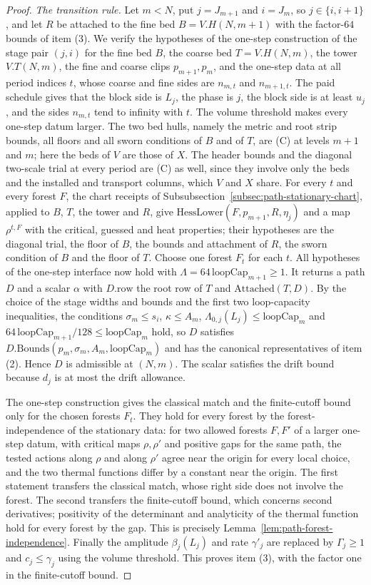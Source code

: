 \begin{proof}
\emph{The transition rule.} Let $m<N$, put $j=J_{m+1}$ and $i=J_m$, so
$j\in\{i,i+1\}$, and let $R$ be attached to the fine bed
$B=V.H(N,m+1)$ with the factor-$64$ bounds of item (3). We verify the
hypotheses of the one-step construction of the stage pair $(j,i)$ for
the fine bed $B$, the coarse bed $T=V.H(N,m)$, the tower $V.T(N,m)$,
the fine and coarse clips $p_{m+1},p_m$, and the one-step data at all
period indices $t$, whose coarse and fine sides are $n_{m,t}$ and
$n_{m+1,t}$. The paid schedule gives that the block side is $L_j$, the
phase is $j$, the block side is at least $u_j$, and the sides
$n_{m,t}$ tend to infinity with $t$. The volume threshold makes every
one-step datum larger. The two bed hulls, namely the metric and root
strip bounds, all floors and all sworn conditions of $B$ and of $T$,
are \textup{(C)} at levels $m+1$ and $m$; here the beds of $V$ are
those of $X$. The header bounds and the diagonal two-scale trial at
every period are \textup{(C)} as well, since they involve only the
beds and the installed and transport columns, which $V$ and $X$ share.
For every $t$ and every forest $F$, the chart receipts of
Subsubsection~\ref{subsec:path-stationary-chart}, applied to $B$, $T$, the
tower and $R$, give $\mathrm{HessLower}(F,p_{m+1},R,\eta_j)$ and a map
$\rho^{t,F}$ with the critical, guessed and heat properties; their
hypotheses are the diagonal trial, the floor of $B$, the bounds and
attachment of $R$, the sworn condition of $B$ and the floor of $T$.
Choose one forest $F_t$ for each $t$. All hypotheses of the one-step
interface now hold with $\Lambda=64\,\mathrm{loopCap}_{m+1}\ge1$. It
returns a path $D$ and a scalar $\alpha$ with
$D.\mathrm{row}$ the root row of $T$ and $\mathrm{Attached}(T,D)$. By
the choice of the stage widths and bounds and the first two
loop-capacity inequalities, the conditions
$\sigma_m\le s_i$, $\kappa\le A_m$, $\Lambda_{0,j}(L_j)\le
\mathrm{loopCap}_m$ and $64\,\mathrm{loopCap}_{m+1}/128\le
\mathrm{loopCap}_m$ hold, so $D$ satisfies
$D.\mathrm{Bounds}(p_m,\sigma_m,A_m,\mathrm{loopCap}_m)$ and has the
canonical representatives of item (2). Hence $D$ is admissible at
$(N,m)$. The scalar satisfies the drift bound because $d_j$ is at most
the drift allowance.

The one-step construction gives the classical match and the
finite-cutoff bound only for the chosen forests $F_t$. They hold for
every forest by the forest-independence of the stationary data: for
two allowed forests $F,F'$ of a larger one-step datum, with critical
maps $\rho,\rho'$ and positive gaps for the same path, the tested
actions along $\rho$ and along $\rho'$ agree near the origin for every
local choice, and the two thermal functions differ by a constant near
the origin. The first statement transfers the classical match, whose
right side does not involve the forest. The second transfers the
finite-cutoff bound, which concerns second derivatives; positivity of
the determinant and analyticity of the thermal function hold for every
forest by the gap. This is precisely Lemma~\ref{lem:path-forest-independence}. Finally the amplitude
$\beta_j(L_j)$ and rate $\gamma'_j$ are replaced by $\Gamma_j\ge1$ and
$c_j\le\gamma_j$ using the volume threshold. This proves item (3), with the
factor one in the finite-cutoff bound.


\end{proof}
